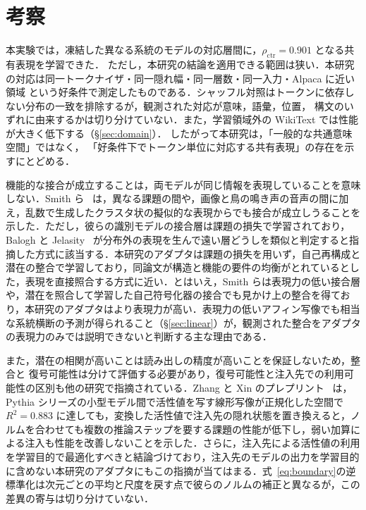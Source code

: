 \documentclass[techrep,noauthor]{ipsj}
\newcommand{\kw}[1]{#1}
\begin{document}
\section{考察}\label{sec:discussion}
本実験では，凍結した異なる系統のモデルの対応層間に，$\rho_{\mathrm{ctr}}\!=\!0.901$ となる共有表現を学習できた．
\kw{ただし，本研究の結論を適用できる範囲は狭い}．本研究の対応は同一トークナイザ・同一隠れ幅・同一層数・同一入力・Alpaca に近い領域
という好条件で測定したものである．シャッフル対照はトークンに依存しない分布の一致を排除するが，観測された対応が意味，語彙，位置，
構文のいずれに由来するかは切り分けていない．また，学習領域外の WikiText では性能が大きく低下する（\S\ref{sec:domain}）．
したがって本研究は，「一般的な共通意味空間」ではなく，
「好条件下でトークン単位に対応する共有表現」の存在を示すにとどめる．

機能的な接合が成立することは，両モデルが同じ情報を表現していることを意味しない．Smith ら~\cite{pmlr-v267-smith25a} は，異なる課題の間や，画像と鳥の鳴き声の音声の間に加え，乱数で生成したクラスタ状の擬似的な表現からでも接合が成立しうることを示した．ただし，彼らの識別モデルの接合層は課題の損失で学習されており，Balogh と Jelasity~\cite{balogh2025not} が分布外の表現を生んで遠い層どうしを類似と判定すると指摘した方式に該当する．本研究のアダプタは課題の損失を用いず，自己再構成と潜在の整合で学習しており，同論文が構造と機能の要件の均衡がとれているとした，表現を直接照合する方式に近い．とはいえ，Smith らは表現力の低い接合層や，潜在を照合して学習した自己符号化器の接合でも見かけ上の整合を得ており，本研究のアダプタはより表現力が高い．表現力の低いアフィン写像でも相当な系統横断の予測が得られること（\S\ref{sec:linear}）が，観測された整合をアダプタの表現力のみでは説明できないと判断する主な理由である．

また，潜在の相関が高いことは読み出しの精度が高いことを保証しないため，整合と
復号可能性は分けて評価する必要があり，復号可能性と注入先での利用可能性の区別も他の研究で指摘されている．Zhang と Xin のプレプリント~\cite{zhang2026negativeresultcrossmodelactivation} は，Pythia シリーズの小型モデル間で活性値を写す線形写像が正規化した空間で $R^2=0.883$ に達しても，変換した活性値で注入先の隠れ状態を置き換えると，ノルムを合わせても複数の推論ステップを要する課題の性能が低下し，弱い加算による注入も性能を改善しないことを示した．さらに，注入先による活性値の利用を学習目的で最適化すべきと結論づけており，注入先のモデルの出力を学習目的に含めない本研究のアダプタにもこの指摘が当てはまる．式~\eqref{eq:boundary}の逆標準化は次元ごとの平均と尺度を戻す点で彼らのノルムの補正と異なるが，この差異の寄与は切り分けていない．
\end{document}

